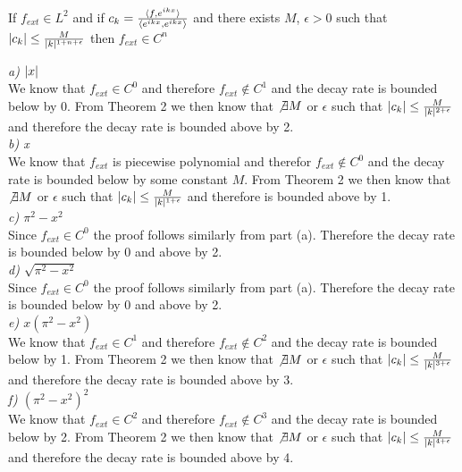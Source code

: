 \documentclass[12pt]{article}
\DeclarePairedDelimiter \abs{\lvert}{\rvert}%
\newenvironment{theorem}[2][]{\begin{trivlist}
\item[{\bfseries #1}\hskip \labelsep {\bfseries #2.}]}{\end{trivlist}}
\theoremstyle{remark}
\begin{document}
\begin{theorem}{Theorem 2}
	If $f_{ext} \in L^2$ and if $c_k = \frac{\braket{f, e^{ikx}}}{\braket{e^{ikx}, e^{ikx}}}$ and there exists $M$, $\epsilon > 0$ such that $\abs{c_k} \leq \frac{M}{\abs{k}^{1+n+\epsilon}}$ then $f_{ext} \in C^n$
\end{theorem}

\textit{a) $\abs{x}$} \\

We know that $f_{ext} \in C^0$ and therefore $f_{ext} \not\in C^1$ and the decay rate is bounded below by 0. From Theorem 2 we then know that $\not\exists M$ or $\epsilon$ such that $\abs{c_k} \leq \frac{M}{\abs{k}^{2+\epsilon}}$ and therefore the decay rate is bounded above by 2. \\

\textit{b) x} \\

We know that $f_{ext}$ is piecewise polynomial and therefor $f_{ext} \not\in C^0$ and the decay rate is bounded below by some constant $M$. From Theorem 2 we then know that $\not\exists M$ or $\epsilon$ such that $\abs{c_k} \leq \frac{M}{\abs{k}^{1+\epsilon}}$ and therefore is bounded above by 1. \\

\textit{c) $\pi^2 - x^2$} \\

Since $f_{ext} \in C^0$ the proof follows similarly from part (a). Therefore the decay rate is bounded below by 0 and above by 2. \\

\textit{d) $\sqrt{\pi^2 - x^2}$} \\ 

Since $f_{ext} \in C^0$ the proof follows similarly from part (a). Therefore the decay rate is bounded below by 0 and above by 2. \\

\textit{e) $x(\pi^2 - x^2)$} \\ 

We know that $f_{ext} \in C^1$ and therefore $f_{ext} \not\in C^2$ and the decay rate is bounded below by 1. From Theorem 2 we then know that $\not\exists M$ or $\epsilon$ such that $\abs{c_k} \leq \frac{M}{\abs{k}^{3+\epsilon}}$ and therefore the decay rate is bounded above by 3. \\

\textit{f) $(\pi^2 - x^2)^2$} \\

We know that $f_{ext} \in C^2$ and therefore $f_{ext} \not\in C^3$ and the decay rate is bounded below by 2. From Theorem 2 we then know that $\not\exists M$ or $\epsilon$ such that $\abs{c_k} \leq \frac{M}{\abs{k}^{4+\epsilon}}$ and therefore the decay rate is bounded above by 4. \\
\end{document}
